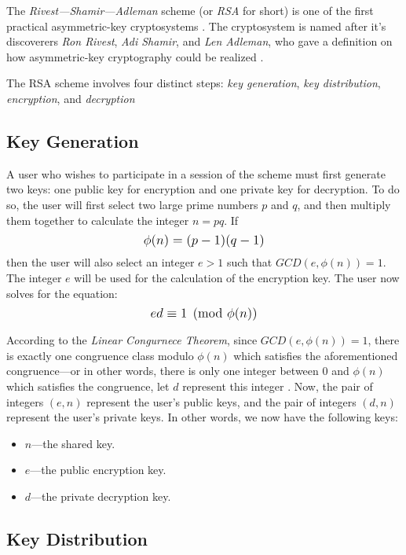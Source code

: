 The \textit{Rivest---Shamir---Adleman} scheme (or \textit{RSA} for short) is one of the first practical asymmetric-key cryptosystems \cite{classical_algebra}. 
The cryptosystem is named after it's discoverers \textit{Ron Rivest}, \textit{Adi Shamir}, and \textit{Len Adleman}, who gave a definition on how 
asymmetric-key cryptography could be realized \cite{classical_algebra}.

The RSA scheme involves four distinct steps: \textit{key generation}, \textit{key distribution}, \textit{encryption}, and \textit{decryption}

\subsection{Key Generation}

A user who wishes to participate in a session of the scheme must first generate two keys: one public key for encryption and one private key for decryption. To do so,
the user will first select two large prime numbers $p$ and $q$, and then multiply them together to calculate the integer $n = pq$. 
If $$\mathlarger{\phi(n) = (p-1)(q-1)}$$ then the user will also select an integer $e > 1$ such that $GCD(e,\phi(n))=1$. 
The integer $e$ will be used for the calculation of the encryption key. The user now solves for the equation: $$\mathlarger{ed \equiv 1 \pmod{\phi(n)}}$$

According to the \textit{Linear Congurnece Theorem}, since $GCD(e,\phi(n))=1$, there is exactly one congruence class modulo $\phi(n)$ which satisfies the aforementioned
congruence---or in other words, there is only one integer between $0$ and $\phi(n)$ which satisfies the congruence, let $d$ represent this integer 
\cite{classical_algebra}. Now, the pair of integers $(e,n)$ represent the user's public keys, and the pair of integers $(d,n)$ represent the user's private keys. 
In other words, we now have the following keys:

\begin{itemize}
    \item $n$---the shared key.
    \item $e$---the public encryption key.
    \item $d$---the private decryption key.
\end{itemize}

\subsection{Key Distribution}


